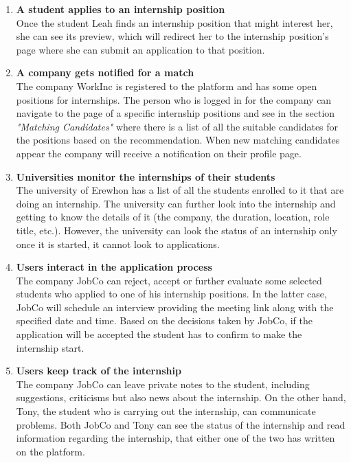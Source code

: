 \begin{enumerate}
            \item \textbf{A student applies to an internship position}                      
            \\Once the student Leah finds an internship position that might interest her, she can see its preview, which will redirect her to the internship position's page where she can submit an application to that position.
            
            \item \textbf{A company gets notified for a match}   
            \\The company WorkInc is registered to the platform and has some open positions for internships. The person who is logged in for the company can navigate to the page of a specific internship positions and see in the section \textit{"Matching Candidates"} where there is a list of all the suitable candidates for the positions based on the recommendation. When new matching candidates appear the company will receive a notification on their profile page.

            \item \textbf{Universities monitor the internships of their students }
            \\ The university of Erewhon has a list of all the students enrolled to it that are doing an internship. The university can further look into the internship and getting to know the details of it (the company, the duration, location, role title, etc.). However, the university can look the status of an internship only once it is started, it cannot look to applications.
            
            \item \textbf{Users interact in the application process}
            \\ The company JobCo can reject, accept or further evaluate some selected students who applied to one of his internship positions. In the latter case, JobCo will schedule an interview providing the meeting link along with the specified date and time. Based on the decisions taken by JobCo, if the application will be accepted the student has to confirm to make the internship start. 
            
            \item \textbf{Users keep track of the internship }
            \\ The company JobCo can leave private notes to the student, including suggestions, criticisms but also news about the internship. On the other hand, Tony, the student who is carrying out the internship, can communicate problems. Both JobCo and Tony can see the status of the internship and read information regarding the internship, that either one of the two has written on the platform.


\end{enumerate}
